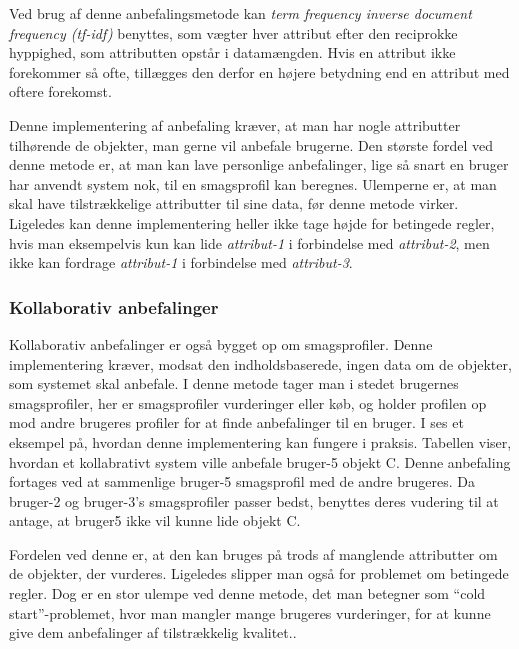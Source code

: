 Ved brug af denne anbefalingsmetode kan \textit{term frequency inverse document frequency (tf-idf)} benyttes, som vægter hver attribut efter den reciprokke hyppighed, som attributten opstår i datamængden.
Hvis en attribut ikke forekommer så ofte, tillægges den derfor en højere betydning end en attribut med oftere forekomst.

Denne implementering af anbefaling kræver, at man har nogle attributter tilhørende de objekter, man gerne vil anbefale brugerne.
Den største fordel ved denne metode er, at man kan lave personlige anbefalinger, lige så snart en bruger har anvendt system nok, til en smagsprofil kan beregnes.
Ulemperne er, at man skal have tilstrækkelige attributter til sine data, før denne metode virker. 
Ligeledes kan denne implementering heller ikke tage højde for betingede regler, hvis man eksempelvis kun kan lide \textit{attribut-1} i forbindelse med \textit{attribut-2}, men ikke kan fordrage \textit{attribut-1} i forbindelse med \textit{attribut-3}.

\subsubsection{Kollaborativ anbefalinger}
Kollaborativ anbefalinger er også bygget op om smagsprofiler.
Denne implementering kræver, modsat den indholdsbaserede, ingen data om de objekter, som systemet skal anbefale. 
I denne metode tager man i stedet brugernes smagsprofiler, her er smagsprofiler vurderinger eller køb, og holder profilen op mod andre brugeres profiler for at finde anbefalinger til en bruger.
I  ses et eksempel på, hvordan denne implementering kan fungere i praksis.
Tabellen viser, hvordan et kollabrativt system ville anbefale bruger-5 objekt C.
Denne anbefaling fortages ved at sammenlige bruger-5 smagsprofil med de andre brugeres.
Da bruger-2 og bruger-3's smagsprofiler passer bedst, benyttes deres vudering til at antage, at bruger5 ikke vil kunne lide objekt C.
\citep{kollabrativEksempel}

Fordelen ved denne er, at den kan bruges på trods af manglende attributter om de objekter, der vurderes.
Ligeledes slipper man også for problemet om betingede regler.
Dog er en stor ulempe ved denne metode, det man betegner som ``cold start''-problemet, hvor man mangler mange brugeres vurderinger, for at kunne give dem anbefalinger af tilstrækkelig kvalitet.\citep{RecommenderSystems}.


